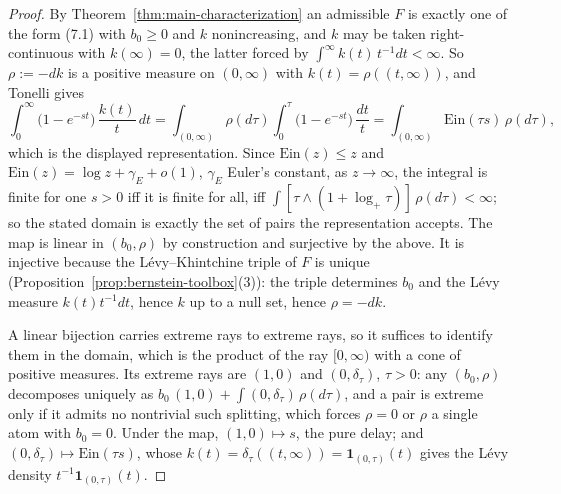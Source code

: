 \begin{proof}
By Theorem~\ref{thm:main-characterization} an admissible $F$ is exactly one of the form (7.1)
with $b_0 \ge 0$ and $k$ nonincreasing, and $k$ may be taken right-continuous with
$k(\infty) = 0$, the latter forced by $\int^\infty k(t)\,t^{-1}dt < \infty$. So $\rho := -dk$
is a positive measure on $(0,\infty)$ with $k(t) = \rho((t,\infty))$, and Tonelli gives
\[
  \int_0^\infty \bigl(1 - e^{-st}\bigr)\,\frac{k(t)}{t}\,dt
  = \int_{(0,\infty)} \rho(d\tau) \int_0^\tau \bigl(1 - e^{-st}\bigr)\,\frac{dt}{t}
  = \int_{(0,\infty)} \mathrm{Ein}(\tau s)\,\rho(d\tau),
\]
which is the displayed representation. Since $\mathrm{Ein}(z) \le z$ and
$\mathrm{Ein}(z) = \log z + \gamma_E + o(1)$, $\gamma_E$ Euler's constant, as $z \to \infty$, the integral is finite for one
$s > 0$ iff it is finite for all, iff $\int [\tau \wedge (1 + \log_+\tau)]\,\rho(d\tau) <
\infty$; so the stated domain is exactly the set of pairs the representation accepts. The map
is linear in $(b_0, \rho)$ by construction and surjective by the above. It is injective because
the L\'evy--Khintchine triple of $F$ is unique (Proposition~\ref{prop:bernstein-toolbox}(3)):
the triple determines $b_0$ and the L\'evy measure $k(t)t^{-1}dt$, hence $k$ up to a null set,
hence $\rho = -dk$.

A linear bijection carries extreme rays to extreme rays, so it suffices to identify them in the
domain, which is the product of the ray $[0,\infty)$ with a cone of positive measures. Its
extreme rays are $(1, 0)$ and $(0, \delta_\tau)$, $\tau > 0$: any $(b_0, \rho)$ decomposes
uniquely as $b_0\,(1,0) + \int (0,\delta_\tau)\,\rho(d\tau)$, and a pair is extreme only if it
admits no nontrivial such splitting, which forces $\rho = 0$ or $\rho$ a single atom with
$b_0 = 0$. Under the map, $(1,0) \mapsto s$, the pure delay; and $(0, \delta_\tau) \mapsto
\mathrm{Ein}(\tau s)$, whose $k(t) = \delta_\tau((t,\infty)) = \mathbf{1}_{(0,\tau)}(t)$ gives
the L\'evy density $t^{-1}\mathbf{1}_{(0,\tau)}(t)$.
\end{proof}

